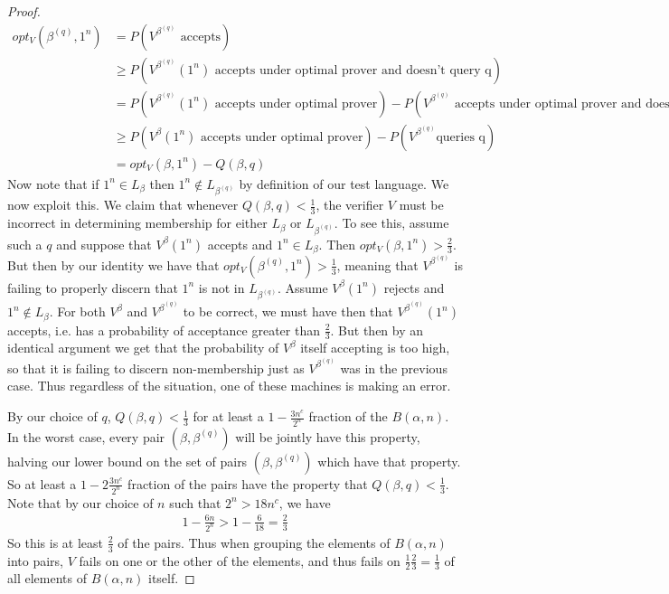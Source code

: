 \documentclass{article}
\theoremstyle{definition}
\theoremstyle{plain}
\theoremstyle{theorem}
\begin{document}
\begin{proof}
	\begin{align}
		opt_V(\beta^{(q)},1^n) &= P(V^{\beta^{(q)}} \textrm{ accepts}) \\
		&\geq P(V^{\beta^{(q)}}(1^n) \textrm{ accepts under optimal prover and doesn't query q}) \\
		&= P(V^{\beta^{(q)}}(1^n) \textrm{ accepts under optimal prover}) - P(V^{\beta^{(q)}} \textrm{ accepts under optimal prover and does query q}) \\
		&\geq P(V^{\beta}(1^n) \textrm{ accepts under optimal prover}) - P(V^{\beta^{(q)}} \textrm{queries q}) \\
		 &= opt_V(\beta,1^n) - Q(\beta,q)
	\end{align} 
	Now note that if $1^n \in L_{\beta}$ then $1^n \notin L_{\beta^{(q)}}$ by definition of our test language. We now exploit this. We claim that whenever $Q(\beta,q) < \frac{1}{3}$, the verifier $V$ must be incorrect in determining membership for either $L_{\beta}$ or $L_{\beta^{(q)}}$. To see this, assume such a $q$ and suppose that $V^{\beta}(1^n)$ accepts and $1^n \in L_{\beta}$. Then $opt_V(\beta,1^n) > \frac{2}{3}$. But then by our identity we have that $opt_V(\beta^{(q)},1^n) > \frac{1}{3}$, meaning that $V^{\beta^{(q)}}$ is failing to properly discern that $1^n$ is not in $L_{\beta^{(q)}}$. Assume $V^{\beta}(1^n)$ rejects and $1^n \notin L_{\beta}$. For both $V^{\beta}$ and $V^{\beta^{(q)}}$ to be correct, we must have then that $V^{\beta^{(q)}}(1^n)$ accepts, i.e. has a probability of acceptance greater than $\frac{2}{3}$. But then by an identical argument we get that the probability of $V^{\beta}$ itself accepting is too high, so that it is failing to discern non-membership just as $V^{\beta^{(q)}}$ was in the previous case. Thus regardless of the situation, one of these machines is making an error. \par 
	By our choice of $q$, $Q(\beta,q) < \frac{1}{3}$ for at least a $1-\frac{3n^c}{2^n}$ fraction of the $B(\alpha,n)$. In the worst case, every pair $(\beta,\beta^{(q)})$ will be jointly have this property, halving our lower bound on the set of pairs $(\beta,\beta^{(q)})$ which have that property. So at least a $1-2\frac{3n^c}{2^n}$ fraction of the pairs have the property that $Q(\beta,q) < \frac{1}{3}$. Note that by our choice of $n$ such that $2^n > 18n^c$, we have
	\begin{align}
		1-\frac{6n}{2^n} > 1-\frac{6}{18} = \frac{2}{3}
	\end{align}
	So this is at least $\frac{2}{3}$ of the pairs. Thus when grouping the elements of $B(\alpha,n)$ into pairs, $V$ fails on one or the other of the elements, and thus fails on $\frac{1}{2}\frac{2}{3} = \frac{1}{3}$ of all elements of $B(\alpha,n)$ itself. \par 

\end{proof}
\end{document}
